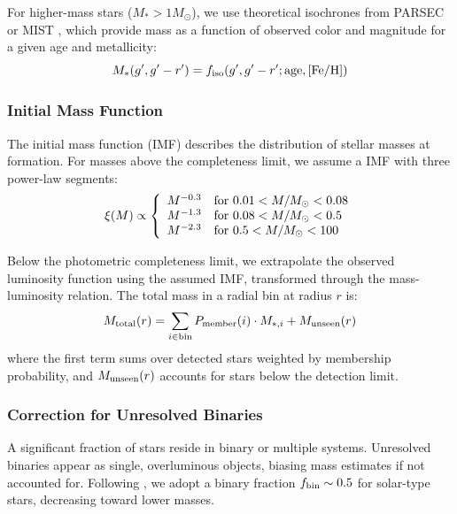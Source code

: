 \documentclass[linenumbers,trackchanges,twocolumn]{aastex701}
\begin{document}
For higher-mass stars ($M_* > 1 M_\odot$), we use theoretical isochrones from PARSEC \citep{bressan2012} or MIST \citep{choi2016}, which provide mass as a function of observed color and magnitude for a given age and metallicity:
\begin{equation}
M_*(g', g'-r') = f_{\rm iso}(g', g'-r'; {\rm age}, [{\rm Fe/H}])
\label{eq:iso_mass}
\end{equation}

\subsubsection{Initial Mass Function}

The initial mass function (IMF) describes the distribution of stellar masses at formation. For masses above the completeness limit, we assume a \citet{kroupa2001} IMF with three power-law segments:
\begin{equation}
\xi(M) \propto \left\{
\begin{array}{ll}
M^{-0.3} & {\rm for}~0.01 < M/M_\odot < 0.08 \\
M^{-1.3} & {\rm for}~0.08 < M/M_\odot < 0.5 \\
M^{-2.3} & {\rm for}~0.5 < M/M_\odot < 100
\end{array}
\right.
\label{eq:imf}
\end{equation}

Below the photometric completeness limit, we extrapolate the observed luminosity function using the assumed IMF, transformed through the mass-luminosity relation. The total mass in a radial bin at radius $r$ is:
\begin{equation}
M_{\rm total}(r) = \sum_{i \in {\rm bin}} P_{\rm member}(i) \cdot M_{*,i} + M_{\rm unseen}(r)
\end{equation}
where the first term sums over detected stars weighted by membership probability, and $M_{\rm unseen}(r)$ accounts for stars below the detection limit.

\subsubsection{Correction for Unresolved Binaries}

A significant fraction of stars reside in binary or multiple systems. Unresolved binaries appear as single, overluminous objects, biasing mass estimates if not accounted for. Following \citet{duchene2013}, we adopt a binary fraction $f_{\rm bin} \sim 0.5$ for solar-type stars, decreasing toward lower masses.
\end{document}
